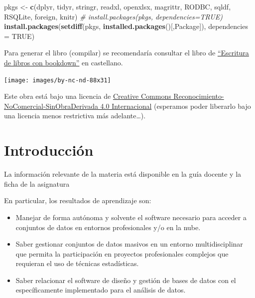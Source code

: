 \documentclass[
]{book}
\newenvironment{Shaded}{\begin{snugshade}}{\end{snugshade}}
\newcommand{\AttributeTok}[1]{\textcolor[rgb]{0.13,0.29,0.53}{#1}}
\newcommand{\CommentTok}[1]{\textcolor[rgb]{0.56,0.35,0.01}{\textit{#1}}}
\newcommand{\ConstantTok}[1]{\textcolor[rgb]{0.56,0.35,0.01}{#1}}
\newcommand{\FunctionTok}[1]{\textcolor[rgb]{0.13,0.29,0.53}{\textbf{#1}}}
\newcommand{\NormalTok}[1]{#1}
\newcommand{\OtherTok}[1]{\textcolor[rgb]{0.56,0.35,0.01}{#1}}
\newcommand{\StringTok}[1]{\textcolor[rgb]{0.31,0.60,0.02}{#1}}
\begin{document}
\begin{Shaded}
\begin{Highlighting}[]
\NormalTok{pkgs }\OtherTok{\textless{}{-}} \FunctionTok{c}\NormalTok{(}\StringTok{\textquotesingle{}dplyr\textquotesingle{}}\NormalTok{, }\StringTok{\textquotesingle{}tidyr\textquotesingle{}}\NormalTok{, }\StringTok{\textquotesingle{}stringr\textquotesingle{}}\NormalTok{, }\StringTok{\textquotesingle{}readxl\textquotesingle{}}\NormalTok{, }\StringTok{\textquotesingle{}openxlsx\textquotesingle{}}\NormalTok{, }\StringTok{\textquotesingle{}magrittr\textquotesingle{}}\NormalTok{, }
          \StringTok{\textquotesingle{}RODBC\textquotesingle{}}\NormalTok{, }\StringTok{\textquotesingle{}sqldf\textquotesingle{}}\NormalTok{, }\StringTok{\textquotesingle{}RSQLite\textquotesingle{}}\NormalTok{, }\StringTok{\textquotesingle{}foreign\textquotesingle{}}\NormalTok{, }\StringTok{\textquotesingle{}knitr\textquotesingle{}}\NormalTok{)}
\CommentTok{\# install.packages(pkgs, dependencies=TRUE)}
\FunctionTok{install.packages}\NormalTok{(}\FunctionTok{setdiff}\NormalTok{(pkgs, }\FunctionTok{installed.packages}\NormalTok{()[,}\StringTok{\textquotesingle{}Package\textquotesingle{}}\NormalTok{]), }\AttributeTok{dependencies =} \ConstantTok{TRUE}\NormalTok{)}
\end{Highlighting}
\end{Shaded}

Para generar el libro (compilar) se recomendaría consultar el libro de
\href{https://rubenfcasal.github.io/bookdown_intro}{``Escritura de libros con
bookdown''} en castellano.

\texttt{[image: images/by-nc-nd-88x31]}

Este obra está bajo una licencia de \href{https://creativecommons.org/licenses/by-nc-nd/4.0/deed.es_ES}{Creative Commons
Reconocimiento-NoComercial-SinObraDerivada 4.0
Internacional}
(esperamos poder liberarlo bajo una licencia menos restrictiva más
adelante\ldots).

\chapter{Introducción}\label{introducciuxf3n}

La información relevante de la materia está disponible en la guía docente y la ficha de la asignatura

En particular, los resultados de aprendizaje son:

\begin{itemize}
\item
  Manejar de forma autónoma y solvente el software necesario para acceder a conjuntos de datos en entornos profesionales y/o en la nube.
\item
  Saber gestionar conjuntos de datos masivos en un entorno multidisciplinar que permita la participación en proyectos profesionales complejos que requieran el uso de técnicas estadísticas.
\item
  Saber relacionar el software de diseño y gestión de bases de datos con el específicamente implementado para el análisis de datos.
\end{itemize}
\end{document}
